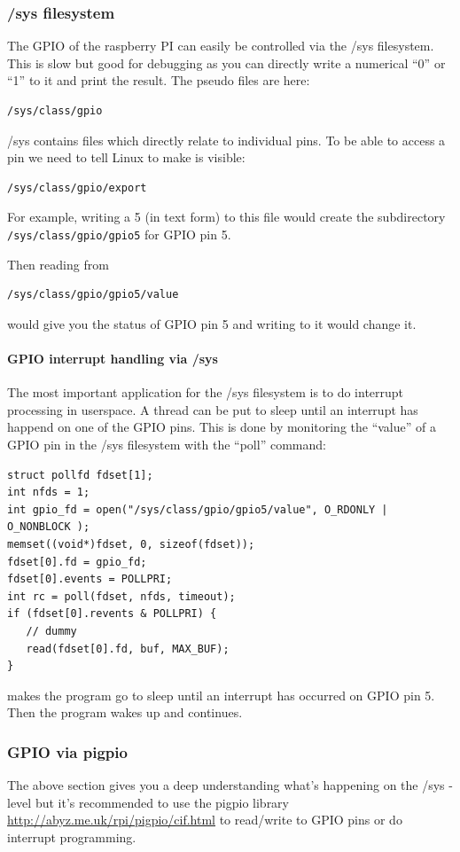 \documentclass[12pt]{article}
\begin{document}
\subsubsection{/sys filesystem}
The GPIO of the raspberry PI can easily be controlled via
the /sys filesystem. This is slow but good for
debugging as you can directly write a numerical
``0'' or ``1'' to it and print the result. The
pseudo files are here:
\begin{verbatim}
/sys/class/gpio
\end{verbatim}

/sys contains files which directly relate to individual pins.
To be able to access a pin we need to tell Linux to make
is visible:
\begin{verbatim}
/sys/class/gpio/export
\end{verbatim}
For example, writing a 5 (in text form) to this file would
create the subdirectory \texttt{/sys/class/gpio/gpio5} for GPIO pin 5.

Then reading from
\begin{verbatim}
/sys/class/gpio/gpio5/value
\end{verbatim}
would give you the status of GPIO pin 5 and writing
to it would change it.

\paragraph{GPIO interrupt handling via /sys}
The most important application for the /sys filesystem is to
do interrupt processing in userspace.
A thread can be put to sleep until an interrupt has happend on one of
the GPIO pins. This is done by monitoring the ``value''
of a GPIO pin in the /sys filesystem with the ``poll'' command:
\begin{verbatim}
struct pollfd fdset[1];
int nfds = 1;
int gpio_fd = open("/sys/class/gpio/gpio5/value", O_RDONLY | O_NONBLOCK );
memset((void*)fdset, 0, sizeof(fdset));
fdset[0].fd = gpio_fd;
fdset[0].events = POLLPRI;
int rc = poll(fdset, nfds, timeout);
if (fdset[0].revents & POLLPRI) {
   // dummy
   read(fdset[0].fd, buf, MAX_BUF);
}
\end{verbatim}
makes the program go to sleep until an interrupt has occurred on
GPIO pin 5. Then the program wakes up and continues.

\subsubsection{GPIO via pigpio}
The above section gives you a deep understanding what's happening
on the /sys - level but it's recommended to
use the pigpio library \url{http://abyz.me.uk/rpi/pigpio/cif.html}
to read/write to GPIO pins or do interrupt programming.
\end{document}
